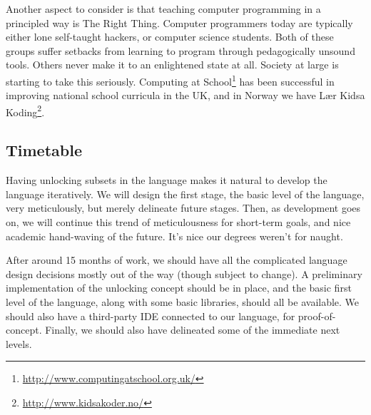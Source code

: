 Another aspect to consider is that teaching computer programming in a 
principled way is The Right Thing. Computer programmers today are typically 
either lone self-taught hackers, or computer science students. Both of these 
groups suffer setbacks from learning to program through pedagogically unsound 
tools. Others never make it to an enlightened state at all. Society at large 
is starting to take this seriously. Computing at 
School\footnote{\url{http://www.computingatschool.org.uk/}} has been 
successful in improving national school curricula in the UK, and in Norway we 
have Lær Kidsa Koding\footnote{\url{http://www.kidsakoder.no/}}.

\subsection{Timetable}
Having unlocking subsets in the language makes it natural to develop the 
language iteratively. We will design the first stage, the basic level of the 
language, very meticulously, but merely delineate future stages. Then, as 
development goes on, we will continue this trend of meticulousness for 
short-term goals, and nice academic hand-waving of the future. It's nice our 
degrees weren't for naught.

After around 15 months of work, we should have all the complicated language 
design decisions mostly out of the way (though subject to change). A 
preliminary implementation of the unlocking concept should be in place, and 
the basic first level of the language, along with some basic libraries, should 
all be available. We should also have a third-party IDE connected to our 
language, for proof-of-concept. Finally, we should also have delineated some 
of the immediate next levels.
